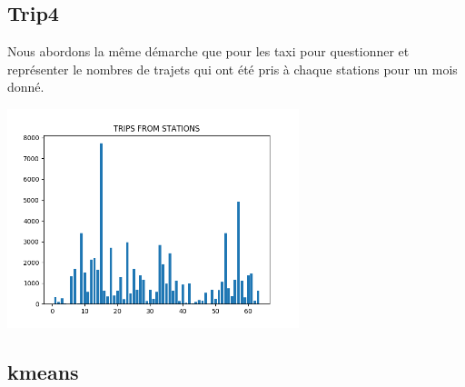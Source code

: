 \documentclass[]{report}
\begin{document}
	\subsection{Trip4}
	Nous abordons la même démarche que pour les taxi pour questionner et représenter le nombres de trajets qui ont été pris à chaque stations pour un mois donné.
	\begin{center}
		\includegraphics[width=85mm]{Figures/histogram_trip_from_station.png}
	\end{center}
	
	\subsection{kmeans}
\end{document}
